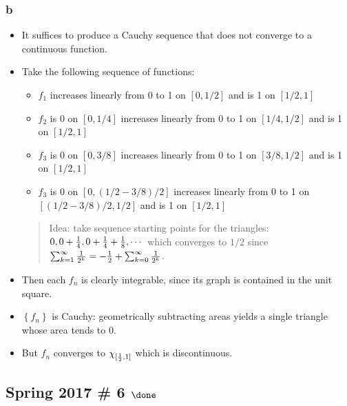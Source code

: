 \begin{solution}
\hypertarget{b-17}{%
\subsubsection{b}\label{b-17}}

\begin{itemize}
\item
  It suffices to produce a Cauchy sequence that does not converge to a
  continuous function.
\item
  Take the following sequence of functions:

  \begin{itemize}
  \tightlist
  \item
    \(f_1\) increases linearly from 0 to 1 on \([0, 1/2]\) and is 1 on
    \([1/2, 1]\)
  \item
    \(f_2\) is 0 on \([0, 1/4]\) increases linearly from 0 to 1 on
    \([1/4, 1/2]\) and is 1 on \([1/2, 1]\)
  \item
    \(f_3\) is 0 on \([0, 3/8]\) increases linearly from 0 to 1 on
    \([3/8, 1/2]\) and is 1 on \([1/2, 1]\)
  \item
    \(f_3\) is 0 on \([0, (1/2 - 3/8)/2]\) increases linearly from 0 to
    1 on \([(1/2 - 3/8)/2, 1/2]\) and is 1 on \([1/2, 1]\)
  \end{itemize}

  \begin{quote}
  Idea: take sequence starting points for the triangles:
  \(0, 0 + {1\over 4}, 0 + {1 \over 4} + {1\over 8}, \cdots\) which
  converges to \(1/2\) since
  \(\sum_{k=1}^\infty{1\over 2^k} = -{1\over 2} + \sum_{k=0}^\infty {1\over 2^k}\).
  \end{quote}
\item
  Then each \(f_n\) is clearly integrable, since its graph is contained
  in the unit square.
\item
  \(\left\{{f_n}\right\}\) is Cauchy: geometrically subtracting areas
  yields a single triangle whose area tends to 0.
\item
  But \(f_n\) converges to \(\chi_{[{1\over 2}, 1]}\) which is
  discontinuous.
\end{itemize}


\end{solution}

\hypertarget{spring-2017-6-done}{%
\subsection{\texorpdfstring{Spring 2017 \# 6
\(\done\)}{Spring 2017 \# 6 \textbackslash done}}\label{spring-2017-6-done}}

